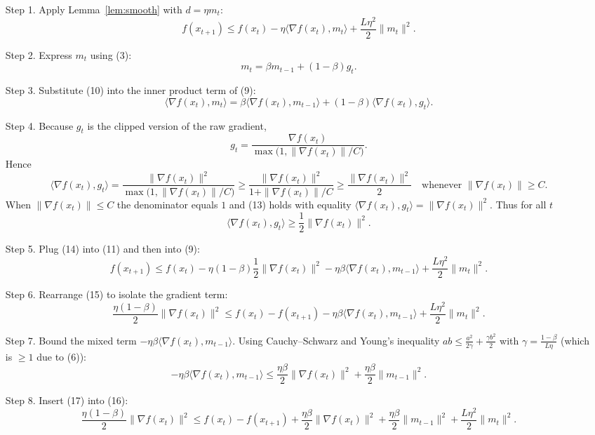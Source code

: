\documentclass{article}
\begin{document}
\begin{enumerate}
\item[Step 1.] Apply Lemma~\ref{lem:smooth} with $d=\eta m_t$:
\[
f(x_{t+1})\le f(x_t)-\eta\langle\nabla f(x_t),m_t\rangle
+\frac{L\eta^2}{2}\|m_t\|^2 .
\tag{9}
\]

\item[Step 2.] Express $m_t$ using (3):
\[
m_t=\beta m_{t-1}+(1-\beta)g_t .
\tag{10}
\]

\item[Step 3.] Substitute (10) into the inner product term of (9):
\[
\langle\nabla f(x_t),m_t\rangle
= \beta\langle\nabla f(x_t),m_{t-1}\rangle
+(1-\beta)\langle\nabla f(x_t),g_t\rangle .
\tag{11}
\]

\item[Step 4.] Because $g_t$ is the clipped version of the raw gradient,
\[
g_t = \frac{\nabla f(x_t)}{\max\bigl(1,\|\nabla f(x_t)\|/C\bigr)} .
\tag{12}
\]
Hence
\[
\langle\nabla f(x_t),g_t\rangle
= \frac{\|\nabla f(x_t)\|^2}{\max\bigl(1,\|\nabla f(x_t)\|/C\bigr)}
\ge \frac{\|\nabla f(x_t)\|^2}{1+\|\nabla f(x_t)\|/C}
\ge \frac{\|\nabla f(x_t)\|^2}{2}
\quad\text{whenever }\|\nabla f(x_t)\|\ge C .
\tag{13}
\]
When $\|\nabla f(x_t)\|\le C$ the denominator equals $1$ and (13)
holds with equality $\langle\nabla f(x_t),g_t\rangle=\|\nabla f(x_t)\|^2$.
Thus for all $t$
\[
\langle\nabla f(x_t),g_t\rangle\ge\frac{1}{2}\|\nabla f(x_t)\|^2 .
\tag{14}
\]

\item[Step 5.] Plug (14) into (11) and then into (9):
\[
f(x_{t+1})\le f(x_t)-\eta(1-\beta)\frac{1}{2}\|\nabla f(x_t)\|^2
-\eta\beta\langle\nabla f(x_t),m_{t-1}\rangle
+\frac{L\eta^2}{2}\|m_t\|^2 .
\tag{15}
\]

\item[Step 6.] Rearrange (15) to isolate the gradient term:
\[
\frac{\eta(1-\beta)}{2}\|\nabla f(x_t)\|^2
\le f(x_t)-f(x_{t+1})
-\eta\beta\langle\nabla f(x_t),m_{t-1}\rangle
+\frac{L\eta^2}{2}\|m_t\|^2 .
\tag{16}
\]

\item[Step 7.] Bound the mixed term $-\eta\beta\langle\nabla f(x_t),m_{t-1}\rangle$.
Using Cauchy–Schwarz and Young’s inequality $ab\le\frac{a^2}{2\gamma}+\frac{\gamma b^2}{2}$
with $\gamma=\frac{1-\beta}{L\eta}$ (which is $\ge1$ due to (6)):
\[
-\eta\beta\langle\nabla f(x_t),m_{t-1}\rangle
\le \frac{\eta\beta}{2}\|\nabla f(x_t)\|^2
+\frac{\eta\beta}{2}\|m_{t-1}\|^2 .
\tag{17}
\]

\item[Step 8.] Insert (17) into (16):
\[
\frac{\eta(1-\beta)}{2}\|\nabla f(x_t)\|^2
\le f(x_t)-f(x_{t+1})
+\frac{\eta\beta}{2}\|\nabla f(x_t)\|^2
+\frac{\eta\beta}{2}\|m_{t-1}\|^2
+\frac{L\eta^2}{2}\|m_t\|^2 .
\tag{18}
\]


\end{enumerate}
\end{document}

